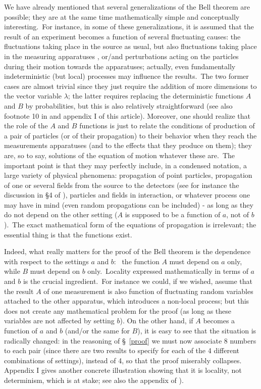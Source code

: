 \documentclass[12pt,onecolumn]{article}%
\begin{document}
\label{general}

We have already mentioned that several generalizations of the Bell theorem are
possible; they are at the same time mathematically simple and conceptually
interesting.\ For instance, in some of these generalizations, it is assumed
that the result of an experiment becomes a function of several fluctuating
causes: the fluctuations taking place in the source as usual, but also
fluctuations taking place in the measuring apparatuses \cite{Bell-Varenna},
or/and perturbations acting on the particles during their motion towards the
apparatuses; actually, even fundamentally indeterministic (but local)
processes may influence the results.\ The two former cases are almost trivial
since they just require the addition of more dimensions to the vector variable
$\lambda$; the latter requires replacing the deterministic functions $A$ and
$B$ by probabilities, but this is also relatively straightforward \cite{FL}
(see also footnote 10 in \cite{Bell-Varenna} and appendix I of this article).
Moreover, one should realize that the role of the $A$ and $B$ functions is
just to relate the conditions of production of a pair of particles (or of
their propagation) to their behavior when they reach the measurements
apparatuses (and to the effects that they produce on them); they are, so to
say, solutions of the equation of motion whatever these are.\ The important
point is that they may perfectly include, in a condensed notation, a large
variety of physical phenomena: propagation of point particles, propagation of
one or several fields from the source to the detectors (see for instance the
discussion in \S 4 of \cite{Bertlmann}), particles and fields in interaction,
or whatever process one may have in mind (even random propagations can be
included) - as long as they do not depend on the other setting ($A$ is
supposed to be a function of $a$, not of $b$).\ The exact mathematical form of
the equations of propagation is irrelevant; the essential thing is that the
functions exist.

Indeed, what really matters for the proof of the Bell theorem is the
dependence with respect to the settings $a$ and $b$: \ the function $A$ must
depend on $a$ only, while $B$ must depend on $b$ only.\ Locality expressed
mathematically in terms of $a$ and $b$ is the crucial ingredient.\ For
instance we could, if we wished, assume that the result $A$ of one measurement
is also function of fluctuating random variables attached to the other
apparatus, which introduces a non-local process; but this does not create any
mathematical problem for the proof (as long as these variables are not
affected by setting $b$). On the other hand, if $A$ becomes a function of $a$
and $b$ (and/or the same for $B$), it is easy to see that the situation is
radically changed: in the reasoning of \S \ \ref{proof} we must now associate
8 numbers to each pair (since there are two results to specify for each of the
4 different combinations of settings), instead of 4, so that the proof
miserably collapses. Appendix I gives another concrete illustration showing
that it is locality, not determinism, which is at stake; see also the appendix
of \cite{FL}).
\end{document}
